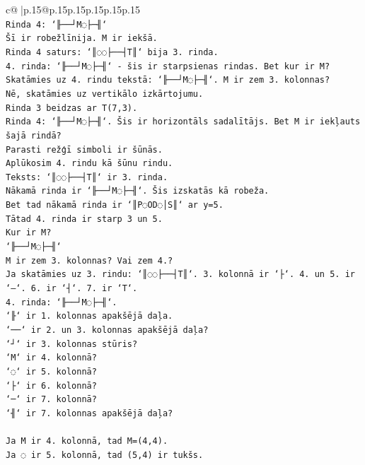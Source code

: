 \documentclass{article}
\begin{document}
{\begin{supertabular}{c@{$\;$}|p{.15\linewidth}@{}p{.15\linewidth}p{.15\linewidth}p{.15\linewidth}p{.15\linewidth}p{.15\linewidth}}
{{{\\ 
\texttt{Rinda 4: `╟──┘M◌├─╢`} \\
\texttt{Šī ir robežlīnija. M ir iekšā.} \\
\texttt{Rinda 4 saturs: `║◌◌├──┤T║` bija 3. rinda.} \\
\texttt{4. rinda: `╟──┘M◌├─╢` {-} šis ir starpsienas rindas. Bet kur ir M?} \\
\texttt{Skatāmies uz 4. rindu tekstā: `╟──┘M◌├─╢`. M ir zem 3. kolonnas?} \\
\texttt{Nē, skatāmies uz vertikālo izkārtojumu.} \\
\texttt{Rinda 3 beidzas ar T(7,3).} \\
\texttt{Rinda 4: `╟──┘M◌├─╢`. Šis ir horizontāls sadalītājs. Bet M ir iekļauts šajā rindā?} \\
\texttt{Parasti režģī simboli ir šūnās.} \\
\texttt{Aplūkosim 4. rindu kā šūnu rindu.} \\
\texttt{Teksts: `║◌◌├──┤T║` ir 3. rinda.} \\
\texttt{Nākamā rinda ir `╟──┘M◌├─╢`. Šis izskatās kā robeža.} \\
\texttt{Bet tad nākamā rinda ir `║P◌OD◌│S║` ar y=5.} \\
\texttt{Tātad 4. rinda ir starp 3 un 5.} \\
\texttt{Kur ir M?} \\
\texttt{`╟──┘M◌├─╢`} \\
\texttt{M ir zem 3. kolonnas? Vai zem 4.?} \\
\texttt{Ja skatāmies uz 3. rindu: `║◌◌├──┤T║`. 3. kolonnā ir `├`. 4. un 5. ir `–`. 6. ir `┤`. 7. ir `T`.} \\
\texttt{4. rinda: `╟──┘M◌├─╢`.} \\
\texttt{`╟` ir 1. kolonnas apakšējā daļa.} \\
\texttt{`──` ir 2. un 3. kolonnas apakšējā daļa?} \\
\texttt{`┘` ir 3. kolonnas stūris?} \\
\texttt{`M` ir 4. kolonnā?} \\
\texttt{`◌` ir 5. kolonnā?} \\
\texttt{`├` ir 6. kolonnā?} \\
\texttt{`─` ir 7. kolonnā?} \\
\texttt{`╢` ir 7. kolonnas apakšējā daļa?} \\
\\ 
\texttt{Ja M ir 4. kolonnā, tad M=(4,4).} \\
\texttt{Ja ◌ ir 5. kolonnā, tad (5,4) ir tukšs.} \\
}}}
\end{supertabular}}
\end{document}
